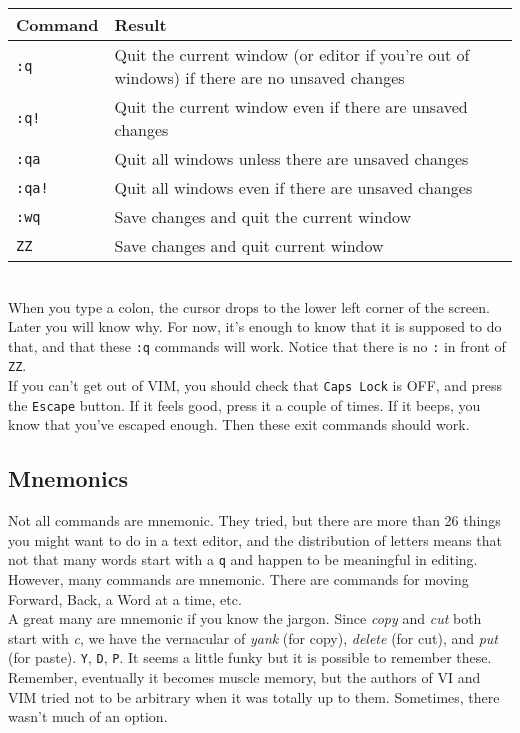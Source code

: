 \documentclass[a4paper, 12pt]{article}
\begin{document}
\begin{tabular}{ l | p{8cm} }
  {\bf Command} & {\bf Result} \\ \hline
  {\tt :q} & Quit the current window (or editor if you're out of windows) if there are no unsaved changes\\
  {\tt :q!} & Quit the current window even if there are unsaved changes\\
  {\tt :qa} &	Quit all windows unless there are unsaved changes\\
  {\tt :qa!} & Quit all windows even if there are unsaved changes\\
  {\tt :wq} &	Save changes and quit the current window\\
  {\tt ZZ} & Save changes and quit current window\\ \hline
\end{tabular}\\

When you type a colon, the cursor drops to the lower left corner of the screen. Later you will know why. For now, it's enough to know that it is supposed to do that, and that these {\tt :q} commands will work. Notice that there is no {\tt :} in front of {\tt ZZ}.\\
If you can't get out of VIM, you should check that {\tt Caps Lock} is OFF, and press the {\tt Escape} button. If it feels good, press it a couple of times. If it beeps, you know that you've escaped enough. Then these exit commands should work.\\
\subsection{Mnemonics}
\label{"Mnemonics"}
Not all commands are mnemonic. They tried, but there are more than 26 things you might want to do in a text editor, and the distribution of letters means that not that many words start with a {\tt q} and happen to be meaningful in editing. However, many commands are mnemonic. There are commands for moving Forward, Back, a Word at a time, etc.\\
A great many are mnemonic if you know the jargon. Since {\it copy} and {\it cut} both start with {\it c}, we have the vernacular of {\it yank} (for copy), {\it delete} (for cut), and {\it put} (for paste). {\tt Y}, {\tt D}, {\tt P}. It seems a little funky but it is possible to remember these. Remember, eventually it becomes muscle memory, but the authors of VI and VIM tried not to be arbitrary when it was totally up to them. Sometimes, there wasn't much of an option.
\end{document}
